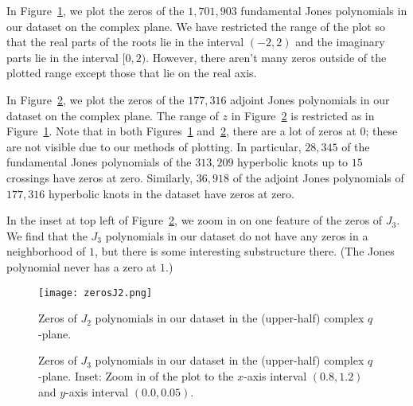 \documentclass[11pt]{article}
\newcommand{\PR}[1]{{\color{teal}{\textbf{PR:} #1}}}
\begin{document}
In Figure~\ref{fig:J2zeros}, we plot the zeros of the $1{,}701{,}903$ fundamental Jones polynomials in our dataset on the complex plane.
We have restricted the range of the plot so that the real parts of the roots lie in the interval $(-2,2)$ and the imaginary parts lie in the interval $[0,2)$.
However, there aren't many zeros outside of the plotted range except those that lie on the real axis. 

In Figure~\ref{fig:J3zeros}, we plot the zeros of the $177{,} 316$ adjoint Jones polynomials in our dataset on the complex plane.
The range of $z$ in Figure~\ref{fig:J3zeros} is restricted as in Figure~\ref{fig:J2zeros}.
Note that in both Figures~\ref{fig:J2zeros} and~\ref{fig:J3zeros}, there are a lot of zeros at $0$; these are not visible due to our methods of plotting.
In particular, $28{,} 345$ of the fundamental Jones polynomials of the $313{,} 209$ hyperbolic knots up to $15$ crossings have zeros at zero.
Similarly, $36{,} 918$ of the adjoint Jones polynomials of $177{,} 316$ hyperbolic knots in the dataset have zeros at zero.

In the inset at top left of Figure~\ref{fig:J3zeros}, we zoom in on one feature of the zeros of $J_3$.
We find that the $J_3$ polynomials in our dataset do not have any zeros in a neighborhood of $1$, but there is some interesting substructure there.
(The Jones polynomial never has a zero at $1$.)


\begin{figure}[h] 
  \begin{center}
    \texttt{[image: zerosJ2.png]}
  \end{center}
  \caption{\textsf{Zeros of $J_2$ polynomials in our dataset in the (upper-half) complex $q$-plane.}}  \label{fig:J2zeros}
\end{figure}
\begin{figure}[h] 
  \begin{center}
  \end{center}
  \caption{\textsf{Zeros of $J_3$ polynomials in our dataset in the (upper-half) complex $q$-plane. Inset: Zoom in of the plot to the $x$-axis interval $(0.8,1.2)$ and $y$-axis interval $(0.0,0.05)$.}}  \label{fig:J3zeros}
\end{figure}
\end{document}
